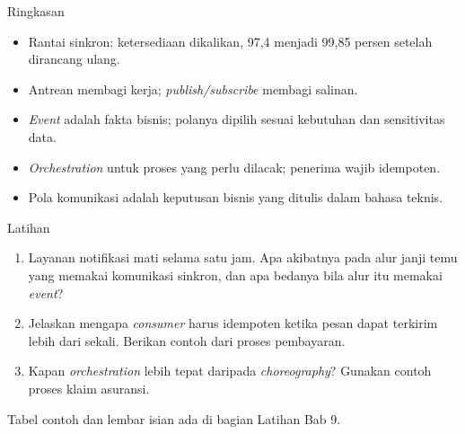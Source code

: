 \documentclass[aspectratio=169, table, 12pt]{beamer}
\begin{document}
\begin{frame}{{\Large Ringkasan}}
  \vspace{6pt}
  \begin{itemize}
    \item Rantai sinkron: ketersediaan dikalikan, 97,4 menjadi 99,85 persen
          setelah dirancang ulang.
    \item Antrean membagi kerja; \textit{publish/subscribe} membagi salinan.
    \item \textit{Event} adalah fakta bisnis; polanya dipilih sesuai kebutuhan
          dan sensitivitas data.
    \item \textit{Orchestration} untuk proses yang perlu dilacak; penerima
          wajib idempoten.
    \item Pola komunikasi adalah keputusan bisnis yang ditulis dalam bahasa
          teknis.
  \end{itemize}
\end{frame}

\begin{frame}{{\Large Latihan}}
  \vspace{6pt}
  \small
  \begin{enumerate}
    \item Layanan notifikasi mati selama satu jam. Apa akibatnya pada alur janji
          temu yang memakai komunikasi sinkron, dan apa bedanya bila alur itu
          memakai \textit{event}?
    \item Jelaskan mengapa \textit{consumer} harus idempoten ketika pesan dapat
          terkirim lebih dari sekali. Berikan contoh dari proses pembayaran.
    \item Kapan \textit{orchestration} lebih tepat daripada
          \textit{choreography}? Gunakan contoh proses klaim asuransi.
  \end{enumerate}
  \vspace{4pt}
  {\footnotesize Tabel contoh dan lembar isian ada di bagian Latihan Bab 9.}
\end{frame}
\end{document}
